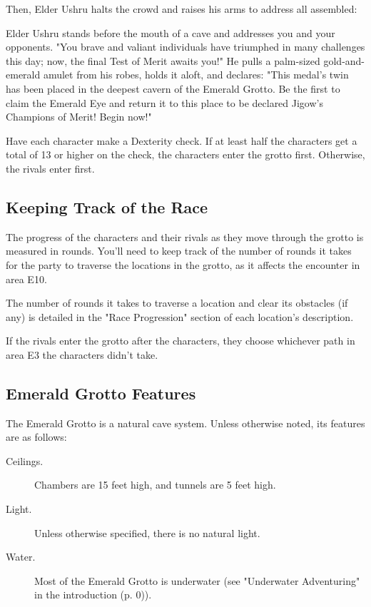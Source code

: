 \documentclass[a4paper, 11pt, bg=full, twocolumn, nooutline]{dndbook}
\begin{document}
Then, Elder Ushru halts the crowd and raises his arms to address all assembled:


\begin{DndReadAloud}
Elder Ushru stands before the mouth of a cave and addresses you and your opponents. "You brave and valiant individuals have triumphed in many challenges this day; now, the final Test of Merit awaits you!" He pulls a palm-sized gold-and-emerald amulet from his robes, holds it aloft, and declares: "This medal's twin has been placed in the deepest cavern of the Emerald Grotto. Be the first to claim the Emerald Eye and return it to this place to be declared Jigow's Champions of Merit! Begin now!"
\end{DndReadAloud}

Have each character make a Dexterity check. If at least half the characters get a total of 13 or higher on the check, the characters enter the grotto first. Otherwise, the rivals enter first.

\subsection{Keeping Track of the Race}

The progress of the characters and their rivals as they move through the grotto is measured in rounds. You'll need to keep track of the number of rounds it takes for the party to traverse the locations in the grotto, as it affects the encounter in area E10.

The number of rounds it takes to traverse a location and clear its obstacles (if any) is detailed in the "Race Progression" section of each location's description.

If the rivals enter the grotto after the characters, they choose whichever path in area E3 the characters didn't take.

\subsection{Emerald Grotto Features}

The Emerald Grotto is a natural cave system. Unless otherwise noted, its features are as follows:

\begin{description}
\item[Ceilings.] Chambers are 15 feet high, and tunnels are 5 feet high.
\item[Light.] Unless otherwise specified, there is no natural light.
\item[Water.] Most of the Emerald Grotto is underwater (see "Underwater Adventuring" in the introduction (p. 0)).
\end{description}
\end{document}
